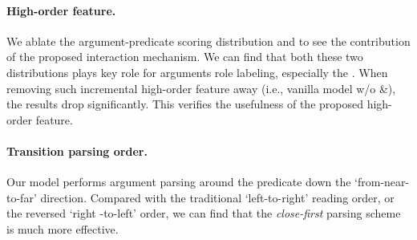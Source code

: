 \documentclass[letterpaper]{article} \usepackage{aaai21}  \usepackage{times}  \usepackage{helvet} \usepackage{courier}  \usepackage[hyphens]{url}  \usepackage{graphicx} \urlstyle{rm} \def\UrlFont{\rm}  \usepackage{natbib}  \usepackage{caption}
\begin{document}
\begin{CJK}{UTF8}{gbsn}
\paragraph{High-order feature.}
We ablate the argument-predicate scoring distribution  and  to see the contribution of the proposed interaction mechanism.
We can find that both these two distributions plays key role for arguments role labeling, especially the .
When removing such incremental high-order feature away (i.e., vanilla model w/o \&), the results drop significantly.
This verifies the usefulness of the proposed high-order feature.


\paragraph{Transition parsing order.}
Our model performs argument parsing around the predicate down the `from-near-to-far' direction.
Compared with the traditional `left-to-right' reading order, or the reversed `right -to-left' order, we can find that the \emph{close-first} parsing scheme is much more effective.










\begin{table*}[!t]
\begin{center}
\end{center}
\caption{
End-to-end SRL on UPB data.
Values are F1 scores for argument recognition and role labeling.
}
\label{UPB}
\end{table*}











\end{CJK}
\end{document}
